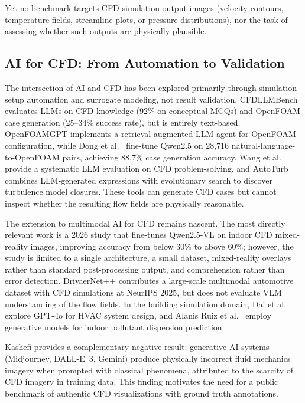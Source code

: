 \documentclass[preprint,12pt]{elsarticle}
\begin{document}
Yet no benchmark targets CFD simulation output
images (velocity contours, temperature fields, streamline plots, or pressure
distributions), nor the task of assessing whether such outputs are physically
plausible.

\subsection{AI for CFD: From Automation to Validation}

The intersection of AI and CFD has been explored primarily through simulation
setup automation and surrogate modeling, not result validation. CFDLLMBench
\cite{somasekharan.panigrahi2025CFDLLMBenchBenchmark} evaluates LLMs on CFD knowledge (92\% on conceptual MCQs)
and OpenFOAM case generation (25--34\% success rate), but is entirely text-based.
OpenFOAMGPT \cite{pandey.etal2025OpenFOAMGPTRetrievalaugmented} implements a retrieval-augmented LLM agent
for OpenFOAM configuration, while Dong et al.\ \cite{dong.etal2025FinetuningLarge} fine-tune
Qwen2.5 on 28,716 natural-language-to-OpenFOAM pairs, achieving 88.7\% case
generation accuracy. Wang et al.\ \cite{wang.etal2025EvaluationsLarge} provide a systematic LLM
evaluation on CFD problem-solving, and AutoTurb \cite{zhang.etal2025AutoTurbUsing} combines
LLM-generated expressions with evolutionary search to discover turbulence model
closures. These tools can generate CFD cases but cannot inspect whether the
resulting flow fields are physically reasonable.

The extension to multimodal AI for CFD remains nascent. The most directly relevant
work is a 2026 study \cite{futamura.fukuda2026QuantitativeEvaluation} that fine-tunes Qwen2.5-VL on indoor CFD
mixed-reality images, improving accuracy from below 30\% to above 60\%; however,
the study is limited to a single architecture, a small dataset, mixed-reality
overlays rather than standard post-processing output, and comprehension rather than
error detection. DrivaerNet++ \cite{elrefaie.etal2025DrivaerNetLargeScale} contributes a large-scale
multimodal automotive dataset with CFD simulations at NeurIPS 2025, but does not
evaluate VLM understanding of the flow fields. In the building simulation domain,
Dai et al.\ \cite{dai.etal2025ApplicationLarge} explore GPT-4o for HVAC system design, and Alanis
Ruiz et al.\ \cite{alanisruiz.etal2025DeepConvolutional} employ generative models for indoor
pollutant dispersion prediction.

Kashefi \cite{kashefi2024MisleadingGallery} provides a complementary negative result: generative AI
systems (Midjourney, DALL-E~3, Gemini) produce physically incorrect fluid mechanics
imagery when prompted with classical phenomena, attributed to the scarcity of
CFD imagery in training data. This finding motivates the need for a public benchmark
of authentic CFD visualizations with ground truth annotations.
\end{document}
